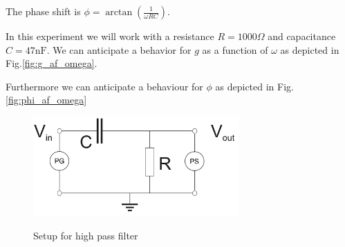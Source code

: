 \documentclass[../main/main.tex]{subfiles}
\begin{document}
The phase shift is \( \phi = \arctan( \frac{1}{ \omega RC })\).

In this experiment we will work with a resistance \( R = 1000 \Omega \) and capacitance \( C = 47 \si{\nano\farad} \).
We can anticipate a behavior for \( g \) as a function of \( \omega \) as depicted in Fig.\ref{fig:g_af_omega}.

Furthermore we can anticipate a behaviour for \( \phi \) as depicted in Fig.\ref{fig:phi_af_omega}

\begin{figure}[!ht]
  \centering
    \includegraphics[width=0.7\textwidth]{../img/setup.png}
    \label{fig:setup}
    \caption{Setup for high pass filter}
\end{figure}
\end{document}
